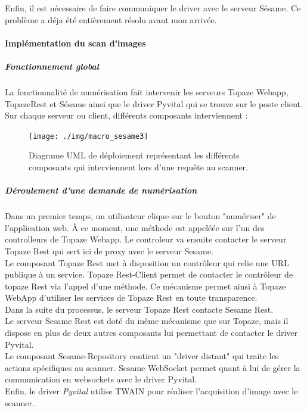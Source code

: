 Enfin, il est nécessaire de faire communiquer le driver avec le serveur Sésame. Ce problème a déja été entièrement résolu avant mon arrivée.

\paragraph*{Implémentation du scan d'images}
\subparagraph*{Fonctionnement global}
La fonctionnalité de numérisation fait intervenir les serveurs Topaze Webapp, TopazeRest et Sésame ainsi que le driver Pyvital qui se trouve sur le poste client.
Sur chaque serveur ou client, différents composants interviennent :
\begin{figure}[H]
  \centering
  \texttt{[image: ./img/macro\_sesame3]}
  \caption{\label{fig:mb_va_ast} Diagrame UML de déploiement représentant les différents composants qui interviennent lors d'une requête au scanner.}
\end{figure}

\subparagraph*{Déroulement d'une demande de numérisation}
Dans un premier temps, un utilisateur clique sur le bouton "numériser" de l'application web. À ce moment, une méthode est appeléée sur l'un des controlleurs de Topaze Webapp. Le controleur va ensuite contacter le serveur Topaze Rest qui sert ici de proxy avec le serveur Sesame. \\
Le composant Topaze Rest met à disposition un contrôleur qui relie une URL publique à un service. Topaze Rest-Client permet de contacter le contrôleur de topaze Rest via l'appel d'une méthode. Ce mécanisme permet ainsi à Topaze WebApp d'utiliser les services de Topaze Rest en toute transparence. \\
Dans la suite du processus, le serveur Topaze Rest contacte Sesame Rest. \\
Le serveur Sesame Rest est doté du même mécanisme que sur Topaze, mais il dispose en plus de deux autres composants lui permettant de contacter le driver Pyvital.\\
Le composant Sesame-Repository contient un "driver distant" qui traite les actions spécifiques au scanner. Sesame WebSocket permet quant à lui de gérer la communication en websockets avec le driver Pyvital.\\
Enfin, le driver \textit{Pyvital} utilise TWAIN pour réaliser l'acquisition d'image avec le scanner.\\

